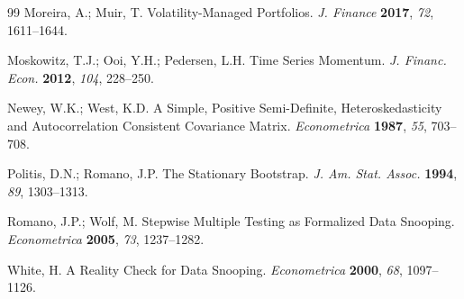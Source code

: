 \documentclass[10pt]{article}
\begin{document}
\begin{thebibliography}{99}
 Moreira, A.; Muir, T.
Volatility-Managed Portfolios. \emph{J. Finance} \textbf{2017}, \emph{72}, 1611--1644.

 Moskowitz, T.J.; Ooi, Y.H.; Pedersen, L.H.
Time Series Momentum. \emph{J. Financ. Econ.} \textbf{2012}, \emph{104}, 228--250.

 Newey, W.K.; West, K.D. A Simple, Positive
Semi-Definite, Heteroskedasticity and Autocorrelation Consistent Covariance Matrix.
\emph{Econometrica} \textbf{1987}, \emph{55}, 703--708.

 Politis, D.N.; Romano, J.P. The
Stationary Bootstrap. \emph{J. Am. Stat. Assoc.} \textbf{1994}, \emph{89}, 1303--1313.

 Romano, J.P.; Wolf, M. Stepwise Multiple
Testing as Formalized Data Snooping. \emph{Econometrica} \textbf{2005}, \emph{73},
1237--1282.

 White, H. A Reality Check for Data Snooping.
\emph{Econometrica} \textbf{2000}, \emph{68}, 1097--1126.
\end{thebibliography}
\end{document}
